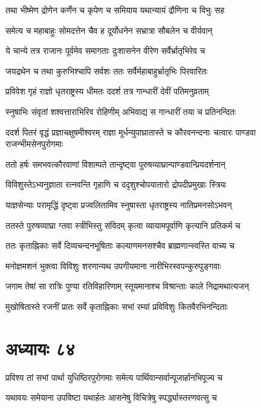 \twolineshloka
{तथा भीष्मेण द्रोणेन कर्णेन च कृपेण च}
{समियाय यथान्यायं द्रौणिना च विभुः सह}


\twolineshloka
{समेत्य च महाबाहुः सोमदत्तेन चैव ह}
{दूर्योधनेन सभ्रात्रा सौबलेन च वीर्यवान्}


\twolineshloka
{ये चान्ये तत्र राजानः पूर्वमेव समागताः}
{दुःशासनेन वीरेण सर्वैर्भ्रातृभिरेव च}


\twolineshloka
{जयद्रथेन च तथा कुरुभिश्चापि सर्वशः}
{ततः सर्वैर्महाबाहुर्भ्रातृभिः पिरवारितः}


\twolineshloka
{प्रविवेश गृहं राज्ञो धृतराष्ट्रस्य धीमतः}
{ददर्श तत्र गान्धारीं देवीं पतिमनुव्रताम्}


\twolineshloka
{स्नुषाभिः संवृतां शश्वत्ताराभिरिव रोहिणीम्}
{अभिवाद्य स गान्धारीं तया च प्रतिनन्दितः}


ददर्श पितरं वृद्धं प्रज्ञाचक्षुषमीश्वरम्
\twolineshloka
{राज्ञा मूर्धन्युपाघ्रातास्ते च कौरवनन्दनाः}
{चत्वारः पाण्डवा राजन्भीमसेनपुरोगमाः}


\twolineshloka
{ततो हर्षः समभवत्कौरवाणां विशाम्पते}
{तान्दृष्ट्वा पुरुषव्याघ्रान्पाण्डवान्प्रियदर्शनान्}


\twolineshloka
{विविशुस्तेऽभ्यनुज्ञाता रत्नवन्ति गृहाणि च}
{ददृशुश्चोपयातारो द्रोपदीप्रमुखाः स्त्रियः}


\twolineshloka
{याज्ञसेन्याः परामृद्धिं दृष्ट्वा प्रज्वलितामिव}
{स्नुषास्ता धृतराष्ट्रस्य नातिप्रमनसोऽभवन्}


\twolineshloka
{ततस्ते पुरुषव्याघ्रा ग्तवा स्त्रीभिस्तु संविदम्}
{कृत्वा व्यायामपूर्वाणि कृत्यानि प्रतिकर्म च}


\twolineshloka
{ततः कृताह्निकाः सर्वे दिव्यचन्दनभूषिताः}
{कल्याणमनसश्चैव ब्राह्मणान्स्वस्ति वाच्य च}


\twolineshloka
{मनोज्ञमशनं भुक्त्वा विविशुः शरणान्यथ}
{उपगीयमाना नारीभिरस्वपन्कुरुपुङ्गवाः}


\twolineshloka
{जगाम तेषां सा रात्रिः पुण्या रतिविहारिणाम्}
{स्तूयमानाश्च विश्रान्ताः काले निद्रामथात्यजन्}


\twolineshloka
{मुखोषितास्ते रजनीं प्रातः सर्वे कृताह्निकाः}
{सभां रम्यां प्रविविशुः कितवैरभिनन्दिताः}


\chapter{अध्यायः ८४}
\twolineshloka
{प्रविश्य तां सभां पार्था युधिष्ठिरपुरोगमाः}
{समेत्य पार्थिवान्सर्वान्पूजार्हानभिपूज्य च}


\twolineshloka
{यथावयः समेयाना उपविष्टा यथार्हतः}
{आसनेषु विचित्रेषु स्पर्द्ध्यास्तरणवत्सु च}


